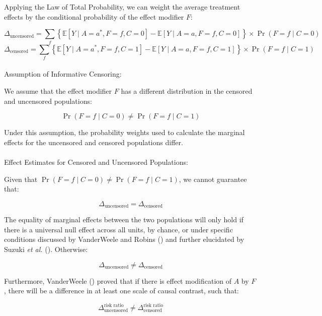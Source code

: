 \documentclass[
  single column]{article}
\makeatletter
\let\oldparagraph\paragraph
\renewcommand{\paragraph}{
    \@ifstar
      \xxxParagraphStar
      \xxxParagraphNoStar
  }
\newcommand{\xxxParagraphStar}[1]{\oldparagraph*{#1}\mbox{}}
\newcommand{\xxxParagraphNoStar}[1]{\oldparagraph{#1}\mbox{}}
\makeatother
\begin{document}
Applying the Law of Total Probability, we can weight the average
treatment effects by the conditional probability of the effect modifier
\(F\):

\[
\Delta_{\text{uncensored}} = \sum_{f} \left\{\mathbb{E}[Y \mid A=a^*, F=f, C=0] - \mathbb{E}[Y \mid A=a, F=f, C=0]\right\} \times \Pr(F=f \mid C=0)
\] \[
\Delta_{\text{censored}} = \sum_{f} \left\{\mathbb{E}[Y \mid A=a^*, F=f, C=1] - \mathbb{E}[Y \mid A=a, F=f, C=1]\right\} \times \Pr(F=f \mid C=1)
\]

\paragraph{Assumption of Informative
Censoring:}\label{assumption-of-informative-censoring}

We assume that the effect modifier \(F\) has a different distribution in
the censored and uncensored populations:

\[
\Pr(F=f \mid C=0) \neq \Pr(F=f \mid C=1)
\]

Under this assumption, the probability weights used to calculate the
marginal effects for the uncensored and censored populations differ.

\paragraph{Effect Estimates for Censored and Uncensored
Populations:}\label{effect-estimates-for-censored-and-uncensored-populations}

Given that \(\Pr(F=f \mid C=0) \neq \Pr(F=f \mid C=1)\), we cannot
guarantee that:

\[
\Delta_{\text{uncensored}} = \Delta_{\text{censored}}
\]

The equality of marginal effects between the two populations will only
hold if there is a universal null effect across all units, by chance, or
under specific conditions discussed by VanderWeele and Robins
() and further elucidated by Suzuki
\emph{et al.} ().
Otherwise:

\[
\Delta_{\text{uncensored}} \ne \Delta_{\text{censored}}
\]

Furthermore, VanderWeele () proved
that if there is effect modification of \(A\) by \(F\), there will be a
difference in at least one scale of causal contrast, such that:

\[
\Delta^{\text{risk ratio}}_{\text{uncensored}} \ne \Delta^{\text{risk ratio}}_{\text{censored}}
\]
\end{document}
